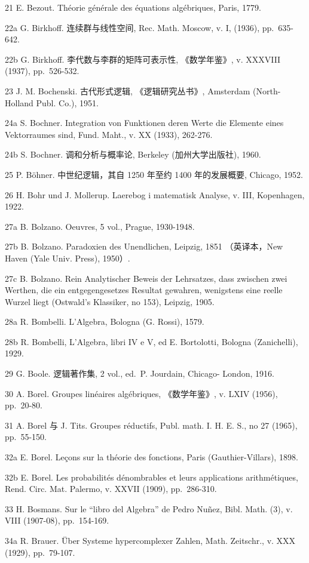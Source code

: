 21 E. Bezout. Théorie générale des équations algébriques, Paris, 1779.

22a G. Birkhoff. 连续群与线性空间, Rec. Math. Moscow, v. I, (1936), pp.~635-642.

22b G. Birkhoff. 李代数与李群的矩阵可表示性, 《数学年鉴》, v. XXXVIII (1937), pp.~526-532.

23 J. M. Bochenski. 古代形式逻辑, 《逻辑研究丛书》, Amsterdam (North-Holland Publ. Co.), 1951.

24a S. Bochner. Integration von Funktionen deren Werte die Elemente eines Vektorraumes sind, Fund. Maht., v. XX (1933), 262-276.

24b S. Bochner. 调和分析与概率论, Berkeley (加州大学出版社), 1960.

25 P. Böhner. 中世纪逻辑，其自 1250 年至约 1400 年的发展概要, Chicago, 1952.

26 H. Bohr und J. Mollerup. Laerebog i matematisk Analyse, v. III, Kopenhagen, 1922.

27a B. Bolzano. Oeuvres, 5 vol., Prague, 1930-1948.

27b B. Bolzano. Paradoxien des Unendlichen, Leipzig, 1851 （英译本，New Haven (Yale Univ. Press), 1950）.

27c B. Bolzano. Rein Analytischer Beweis der Lehrsatzes, dass zwischen zwei Werthen, die ein entgegengesetzes Resultat gewahren, wenigstens eine reelle Wurzel liegt (Ostwald's Klassiker, no 153), Leipzig, 1905.

28a R. Bombelli. L'Algebra, Bologna (G. Rossi), 1579.

28b R. Bombelli, L'Algebra, libri IV e V, ed E. Bortolotti, Bologna (Zanichelli), 1929.

29 G. Boole. 逻辑著作集, 2 vol., ed.~P. Jourdain, Chicago- London, 1916.

30 A. Borel. Groupes linéaires algébriques, 《数学年鉴》, v. LXIV (1956), pp.~20-80.

31 A. Borel 与 J. Tits. Groupes réductifs, Publ. math. I. H. E. S., no 27 (1965), pp.~55-150.

32a E. Borel. Leçons sur la théorie des fonctions, Paris (Gauthier-Villars), 1898.

32b E. Borel. Les probabilités dénombrables et leurs applications arithmétiques, Rend. Circ. Mat. Palermo, v. XXVII (1909), pp.~286-310.

33 H. Bosmans. Sur le ``libro del Algebra'' de Pedro Nuñez, Bibl. Math. (3), v. VIII (1907-08), pp.~154-169.

34a R. Brauer. Über Systeme hypercomplexer Zahlen, Math. Zeitschr., v. XXX (1929), pp.~79-107.


